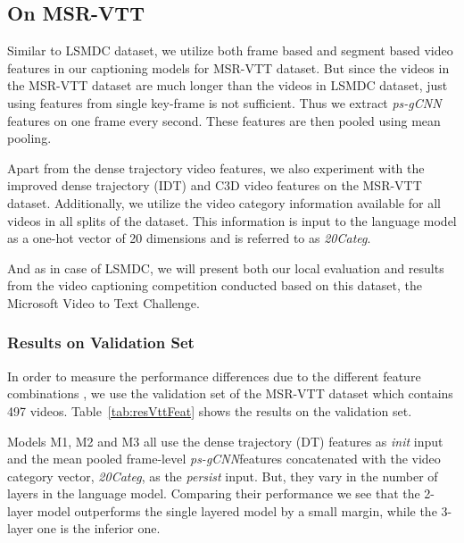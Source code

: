 \subsection{On MSR-VTT}
Similar to LSMDC dataset, we utilize both frame based and segment based video
features in our captioning models for MSR-VTT dataset.
But since the videos in the MSR-VTT dataset are much longer than the videos in
LSMDC dataset, just using features from single key-frame is not sufficient.
Thus we extract \emph{ps-gCNN} features on one frame every second.
These features are then pooled using mean pooling.

Apart from the dense trajectory video features, we also experiment with the
improved dense trajectory (IDT) and C3D video features on the MSR-VTT dataset.
Additionally, we utilize the video category information available for all videos
in all splits of the dataset.
This information is input to the language model as a one-hot vector of 20
dimensions and is referred to as \emph{20Categ}.

And as in case of LSMDC, we will present both our local evaluation and results
from the video captioning competition conducted based on this dataset, the
Microsoft Video to Text Challenge.

\subsubsection{Results on Validation Set}
In order to measure the performance differences due to the different feature
combinations , we use the validation set of the MSR-VTT
dataset which contains 497 videos.
Table~\ref{tab:resVttFeat} shows the results on the validation set.

Models M1, M2 and M3 all use the dense trajectory (DT) features as \emph{init}
input and the mean pooled frame-level \emph{ps-gCNN}features concatenated with
the video category vector, \emph{20Categ}, as the \emph{persist} input.
But, they vary in the number of layers in the language model.
Comparing their performance we see that the 2-layer model outperforms the single
layered model by a small margin, while the 3-layer one is the inferior one.

